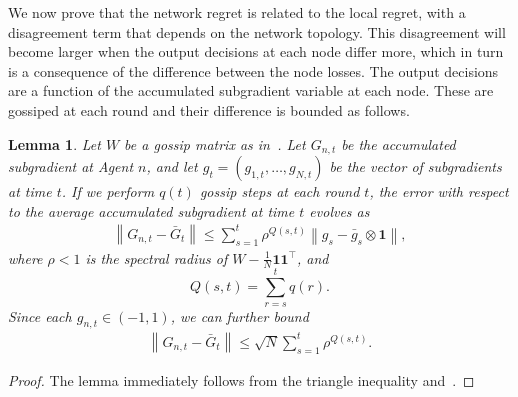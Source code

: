 \documentclass[journal]{IEEEtran} %
\newtheorem{lemma}{Lemma}
\newcommand{\norm}[1]{\left\lVert{#1}\right\rVert}
\begin{document}
We now prove that the network regret is related to the local regret, with a disagreement term that depends on the network topology.
This disagreement will become larger when the output decisions at each node differ more, which in turn is a consequence of the difference between the node losses.
The output decisions are a function of the accumulated subgradient variable at each node.
These are gossiped at each round and their difference is bounded as follows.
\begin{lemma}\label{lemma:G-gossip}
    Let $W$ be a gossip matrix as in~.
    Let $G_{n,t}$ be the accumulated subgradient at Agent $n$, and let $g_t = (g_{1,t}, \ldots, g_{N,t})$ be the vector of subgradients at time $t$.
    If we perform $q(t)$ gossip steps at each round $t$, the error with respect to the average accumulated subgradient at time $t$ evolves as
    \begin{align}
        \norm{G_{n,t} - \bar G_t} \leq \sum_{s=1}^t \rho^{Q(s,t)} \norm{g_{s} - \bar g_s \otimes \mathbf{1}},
    \end{align}
    where $\rho < 1$ is the spectral radius of $W - \frac{1}{N} \mathbf{1} \mathbf{1}^\top$, and
    \begin{equation}
        Q(s,t) = \sum_{r=s}^t q(r).
    \end{equation}
    Since each $g_{n,t} \in (-1,1)$, we can further bound
    \begin{align}
        \norm{G_{n,t} - \bar G_t} \leq \sqrt{N} \sum_{s=1}^t \rho^{Q(s,t)}.
    \end{align}
\end{lemma}
\begin{proof}
    The lemma immediately follows from the triangle inequality and~.
\end{proof}
\end{document}
